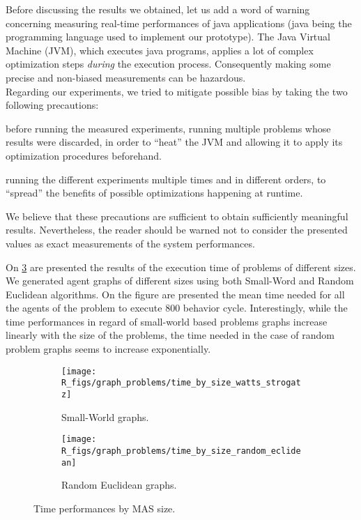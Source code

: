 Before discussing the results we obtained, let us add a word of warning concerning measuring real-time performances of java applications (java being the programming language used to implement our prototype). The Java Virtual Machine (JVM), which executes java programs, applies a lot of complex optimization steps \emph{during} the execution process. Consequently making some precise and non-biased measurements can be hazardous.\\
Regarding our experiments, we tried to mitigate possible bias by taking the two following precautions:
\begin{compactitem}
\item before running the measured experiments, running multiple problems whose results were discarded, in order to \enquote{heat} the JVM and allowing it to apply its optimization procedures beforehand.
\item running the different experiments multiple times and in different orders, to \enquote{spread} the benefits of possible optimizations happening at runtime.
\end{compactitem}
We believe that these precautions are sufficient to obtain sufficiently meaningful results. Nevertheless, the reader should be warned not to consider the presented values as exact measurements of the system performances.

On \figurename{} \ref{time_by_size_perfo} are presented the results of the execution time of problems of different sizes. We generated agent graphs of different sizes using both Small-Word and Random Euclidean algorithms. On the figure are presented the mean time needed for all the agents of the problem to execute 800 behavior cycle. Interestingly, while the time performances in regard of small-world based problems graphs increase linearly with the size of the problems, the time needed in the case of random problem graphs seems to increase exponentially.

\begin{figure}
\centering

	\begin{subfigure}[b]{0.45\textwidth}
		\texttt{[image: R\_figs/graph\_problems/time\_by\_size\_watts\_strogatz]}
		\caption{Small-World graphs.}\label{time_by_size_perfo:ws}
	\end{subfigure}
	\begin{subfigure}[b]{0.45\textwidth}
			\texttt{[image: R\_figs/graph\_problems/time\_by\_size\_random\_eclidean]}
		\caption{Random Euclidean graphs.}\label{time_by_size_perfo:re}
	\end{subfigure}

\caption{Time performances by MAS size.}\label{time_by_size_perfo}
\end{figure}

